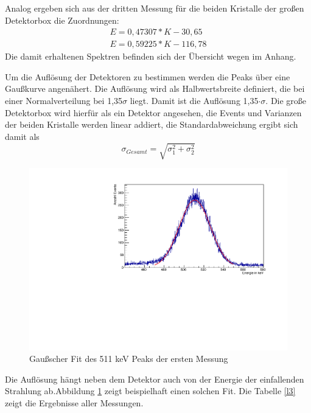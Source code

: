 \documentclass[a4paper,11pt,twoside]{article}
\begin{document}
Analog ergeben sich aus der dritten Messung für die beiden Kristalle der großen Detektorbox die Zuordnungen:
\begin{align}
E=0,47307*K-30,65\\
E=0,59225*K-116,78
\end {align}
Die damit erhaltenen Spektren befinden sich der Übersicht wegen im Anhang.

Um die Auflösung der Detektoren zu bestimmen werden die Peaks über eine Gaußkurve angenähert. Die Auflösung wird als Halbwertsbreite definiert, die bei einer Normalverteilung bei 1,35$\sigma$ liegt. Damit ist die Auflösung 1,35$\cdot\sigma$. Die große Detektorbox wird hierfür als ein Detektor angesehen, die Events und Varianzen der beiden Kristalle werden linear addiert, die Standardabweichung ergibt sich damit als
\begin{equation}
\sigma_{Gesamt}=\sqrt{\sigma_1^2+\sigma_2^2}
\end{equation}

\begin{figure}[htbp]
	\begin{center}
		\includegraphics[width=\textwidth]{Fit1.pdf}
		\caption{Gaußscher Fit des 511 keV Peaks der ersten Messung}
		\label{l2}
	\end{center}
\end{figure}
Die Auflösung hängt neben dem Detektor auch von der Energie der einfallenden Strahlung ab.Abbildung \ref{l2} zeigt beispielhaft einen solchen Fit. Die Tabelle \ref{l3} zeigt die Ergebnisse aller Messungen.
\end{document}
